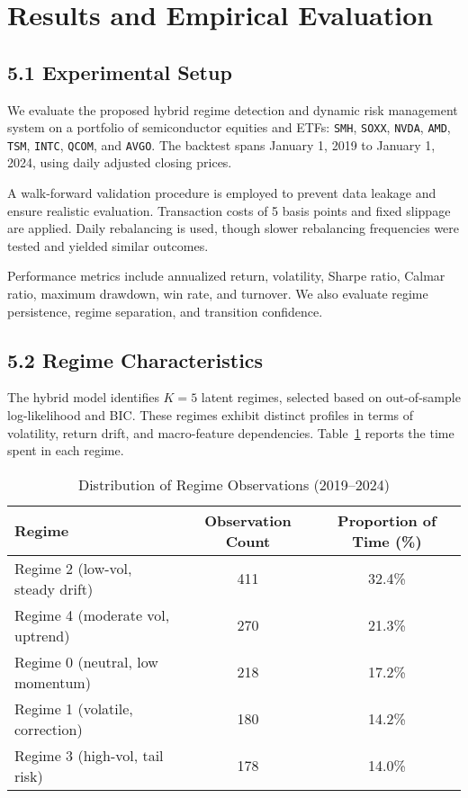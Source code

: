 \section{Results and Empirical Evaluation}

\subsection{5.1 Experimental Setup}

We evaluate the proposed hybrid regime detection and dynamic risk management system on a portfolio of semiconductor equities and ETFs: \texttt{SMH}, \texttt{SOXX}, \texttt{NVDA}, \texttt{AMD}, \texttt{TSM}, \texttt{INTC}, \texttt{QCOM}, and \texttt{AVGO}. The backtest spans January 1, 2019 to January 1, 2024, using daily adjusted closing prices.

A walk-forward validation procedure is employed to prevent data leakage and ensure realistic evaluation. Transaction costs of 5 basis points and fixed slippage are applied. Daily rebalancing is used, though slower rebalancing frequencies were tested and yielded similar outcomes.

Performance metrics include annualized return, volatility, Sharpe ratio, Calmar ratio, maximum drawdown, win rate, and turnover. We also evaluate regime persistence, regime separation, and transition confidence.

\subsection{5.2 Regime Characteristics}

The hybrid model identifies $K=5$ latent regimes, selected based on out-of-sample log-likelihood and BIC. These regimes exhibit distinct profiles in terms of volatility, return drift, and macro-feature dependencies. Table~\ref{tab:regimes} reports the time spent in each regime.

\begin{table}[h]
\centering
\begin{tabular}{lcc}
\toprule
\textbf{Regime} & \textbf{Observation Count} & \textbf{Proportion of Time (\%)} \\
\midrule
Regime 2 (low-vol, steady drift)   & 411 & 32.4\% \\
Regime 4 (moderate vol, uptrend)   & 270 & 21.3\% \\
Regime 0 (neutral, low momentum)   & 218 & 17.2\% \\
Regime 1 (volatile, correction)    & 180 & 14.2\% \\
Regime 3 (high-vol, tail risk)     & 178 & 14.0\% \\
\bottomrule
\end{tabular}
\caption{Distribution of Regime Observations (2019–2024)}
\label{tab:regimes}
\end{table}

